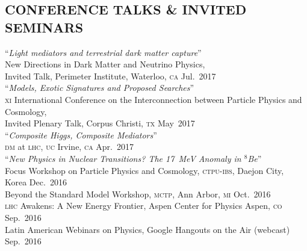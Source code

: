 \documentclass[margin,line]{resume}
\newcommand{\mytalksep}{-.1mm}
\newcommand{\mytalkskip}{2mm}
\newcommand{\scap}[1]{\textsc{\MakeLowercase{#1}}}
\begin{document}
\begin{resume}
\section{\footnotesize \sc
\sffamily 
{}
CONFERENCE 
TALKS \&
INVITED SEMINARS
}

``\emph{Light mediators and terrestrial dark matter capture}'' 
\vspace{\mytalksep}\\ 
New Directions in Dark Matter and Neutrino Physics,\\
	Invited Talk, Perimeter Institute, Waterloo, \scap{CA}
\hfill %
Jul.~2017\vspace{\mytalkskip}\\   
%
%
%
``\emph{Models, Exotic Signatures and Proposed Searches}'' 
\vspace{\mytalksep}\\ 
\scap{XI} International Conference on the Interconnection between Particle Physics and Cosmology,\\
	Invited Plenary Talk, Corpus Christi, \scap{TX}
\hfill %
May~2017\vspace{\mytalkskip}\\   
%
%
%
``\emph{Composite Higgs, Composite Mediators}''
\vspace{\mytalksep}\\ 
\scap{DM} at \scap{LHC}, \scap{UC} Irvine, \scap{CA}
\hfill %
Apr.~2017\vspace{\mytalkskip}\\   
%
%
%
``\emph{New Physics in Nuclear Transitions? The 17~MeV Anomaly in $^8$Be}''
\vspace{\mytalksep}\\ 
%
Focus Workshop on Particle Physics and Cosmology,
\scap{CTPU-IBS},
Daejon City, Korea
\hfill %
Dec.~2016\vspace{\mytalksep}\\ 
%
Beyond the Standard Model Workshop,
\scap{MCTP},
Ann Arbor, \scap{MI}
\hfill %
Oct.~2016\vspace{\mytalksep}\\ 
%
\scap{LHC} Awakens: A New Energy Frontier,
Aspen Center for Physics
Aspen, \scap{CO}
\hfill %
Sep.~2016\vspace{\mytalksep}\\ 
%
Latin American Webinars on Physics,
Google Hangouts on the Air (webcast)
\hfill %
Sep.~2016\vspace{\mytalksep}\\ 

\end{resume}
\end{document}
